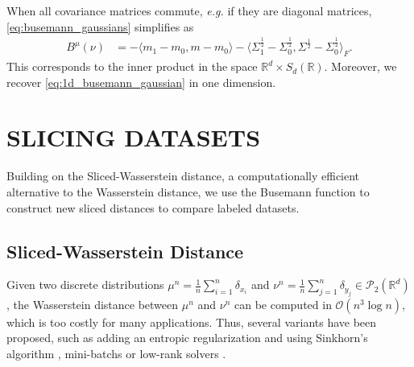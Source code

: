 \documentclass[twoside]{article}
\newcommand{\cP}{\mathcal{P}}
\newcommand{\cO}{\mathcal{O}}
\newcommand{\R}{\mathbb{R}}
\def\mo{m_{0}}
\def\m1{m_{1}}
\def\So{\Sigma_{0}}
\def\S1{\Sigma_{1}}
\begin{document}
When all covariance matrices commute, \emph{e.g.} if they are diagonal matrices, \eqref{eq:busemann_gaussians} simplifies as
\begin{equation}
    \begin{aligned}
        B^\mu(\nu) %
        &= -\langle\m1-\mo,m-\mo\rangle - \langle \S1^\frac12-\So^\frac12, \Sigma^\frac12-\So^\frac12\rangle_F.
    \end{aligned}
\end{equation}
This corresponds to the inner product in the space $\mathbb{R}^d \times S_d(\mathbb{R})$. Moreover, we recover \eqref{eq:1d_busemann_gaussian} in one dimension.


\section{SLICING DATASETS}




Building on the Sliced-Wasserstein distance, a computationally efficient alternative to the Wasserstein distance, we use the Busemann function to construct new sliced distances to compare labeled datasets. %


\subsection{Sliced-Wasserstein Distance}

Given two discrete distributions $\mu^n=\frac1n\sum_{i=1}^n\delta_{x_i}$ and $\nu^n=\frac1n\sum_{j=1}^n\delta_{y_j} \in \cP_2(\R^d)$, the Wasserstein distance between $\mu^n$ and $\nu^n$ can be computed in $\cO(n^3\log n)$, which is too costly for many applications. Thus, several variants have been proposed, such as adding an entropic regularization and using Sinkhorn's algorithm \citep{cuturi2013sinkhorn}, mini-batchs \citep{fatras2020learning,fatras2021minibatch} or low-rank solvers \citep{scetbon2021low}.
\end{document}
